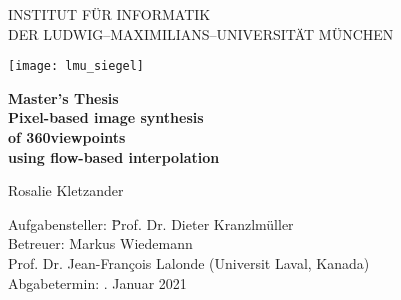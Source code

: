 \begin{center}

\vspace*{-2cm}

{\Huge INSTITUT FÜR INFORMATIK\\[1mm]}
DER LUDWIG--MAXIMILIANS--UNIVERSITÄT MÜNCHEN\\

\vspace*{1cm}

\texttt{[image: lmu\_siegel]}

\vspace*{2cm}

{\Large \textbf{Master's Thesis}}\\ %

\vspace{2.0cm}
{\Huge \textbf{Pixel-based image synthesis}}\\
\vspace*{3mm}
{\Huge \textbf{of 360\degree viewpoints}}\\
\vspace*{3mm}
{\Huge \textbf{using flow-based interpolation}}\\
\vspace{1.5cm}

{\LARGE Rosalie Kletzander} %
\vspace{2cm}

\parbox{1cm}{
\begin{large}
\begin{tabbing}
Aufgabensteller: \hspace{.5cm} \=Prof. Dr. Dieter Kranzlmüller\\[2mm]
Betreuer:
\>Markus Wiedemann\\ %
\>Prof. Dr. Jean-Fran\c{c}ois Lalonde (Universit Laval, Kanada)\\[5mm]%
Abgabetermin: . Januar 2021\\
\end{tabbing}
\end{large}}\\
\vspace{5mm}

\end{center}
